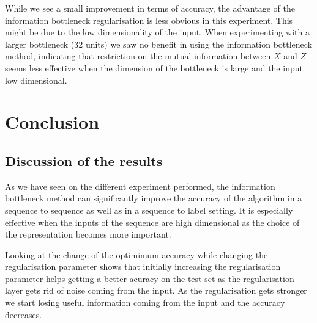 \documentclass[11pt,oneside,openright]{report}
\begin{document}
    \begin{center}
\end{center}

While we see a small improvement in terms of accuracy, the advantage of the information bottleneck regularisation is less obvious in this experiment. This might be due to the low dimensionality of the input. When experimenting with a larger bottleneck (32 units) we saw no benefit in using the information bottleneck method, indicating that restriction on the mutual information between $X$ and $Z$ seems less effective when the dimension of the bottleneck is large and the input low dimensional.

\chapter{Conclusion}
\section{Discussion of the results}
As we have seen on the different experiment performed, the information bottleneck method can significantly improve the accuracy of the algorithm in a sequence to sequence as well as in a sequence to label setting. It is especially effective when the inputs of the sequence are high dimensional as the choice of the representation becomes more important.

Looking at the change of the optimimum accuracy while changing the regularisation parameter shows that initially increasing the regularisation parameter helps getting a better acuracy on the test set as the regularisation layer gets rid of noise coming from the input. As the regularisation gets stronger we start losing useful information coming from the input and the accuracy decreases. 
\end{document}
